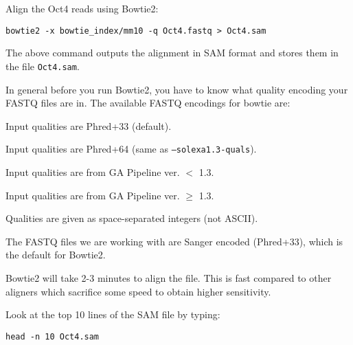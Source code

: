 \begin{steps}
Align the Oct4 reads using Bowtie2: 

\begin{lstlisting}
bowtie2 -x bowtie_index/mm10 -q Oct4.fastq > Oct4.sam
\end{lstlisting}

The above command outputs the alignment in SAM format and stores them in the
file \texttt{Oct4.sam}.
\end{steps}

\begin{note}
In general before you run Bowtie2, you have to know what quality encoding your FASTQ files
are in. The available FASTQ encodings for bowtie are:

\begin{description}[style=multiline,labelindent=0cm,align=right,leftmargin=\descriptionlabelspace,rightmargin=1.5cm,font=\ttfamily]
 \item[--phred33-quals] Input qualities are Phred+33 (default).
 \item[--phred64-quals] Input qualities are Phred+64 (same as \texttt{--solexa1.3-quals}).
 \item[--solexa-quals] Input qualities are from GA Pipeline ver. $<$ 1.3.
 \item[--solexa1.3-quals] Input qualities are from GA Pipeline ver. $\geq$ 1.3.
 \item[--integer-quals] Qualities are given as space-separated integers (not ASCII).
\end{description}

The FASTQ files we are working with are Sanger encoded (Phred+33), which is the
default for Bowtie2.

Bowtie2 will take 2-3 minutes to align the file. This is fast compared to
other aligners which sacrifice some speed to obtain higher sensitivity.
\end{note}

\begin{steps}
Look at the top 10 lines of the SAM file by typing:

\begin{lstlisting}
head -n 10 Oct4.sam
\end{lstlisting}
\end{steps}

